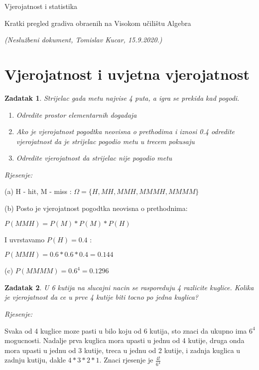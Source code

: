 \documentclass{report}
\newcommand{\Dbar}{\stackinset{l}{0.1ex}{c}{}{\rule{0.33em}{0.3pt}}{D}}
\newcommand{\rjesenje}{\begin{flushleft}\it Rjesenje:\end{flushleft}}
\newcommand{\onespace}{\vspace{1pc}}
\theoremstyle{plain}
\newtheorem{thm}{Zadatak}[chapter] %
\begin{document}
\centerline{\sc \large Vjerojatnost i statistika}
\vspace{.5pc}
\centerline{\sc Kratki pregled gradiva obra\scriptsize\Dbar\normalsize enih na Visokom učilištu Algebra}
\centerline{\it (Neslužbeni dokument, Tomislav Kucar, 15.9.2020.)}
\vspace{2pc}


\section{Vjerojatnost i uvjetna vjerojatnost}
\begin{thm}Strijelac gada metu najvise 4 puta, a igra se prekida kad pogodi.
    \begin{enumerate}[label=(\alph*)]
        \item Odredite prostor elementarnih dogadaja
        \item Ako je vjerojatnost pogodtka neovisna o prethodima i iznosi 0.4 
        odredite vjerojatnost da je strijelac pogodio metu u trecem pokusaju
        \item Odredite vjerojatnost da strijelac nije pogodio metu
    \end{enumerate}
\end{thm} 
\rjesenje

(a) H - hit, M - miss : $\Omega = \{H, MH, MMH, MMMH, MMMM\}$

\onespace

(b) Posto je vjerojatnost pogodtka neovisna o prethodnima: \vspace{0.5pc}

$P(MMH) = P(M) * P(M) * P(H)$ \vspace{0.5pc}

I uvrstavamo $P(H) = 0.4$ : \vspace{0.5pc}

$P(MMH) = 0.6 * 0.6 * 0.4 = 0.144$

\onespace

(c) $P(MMMM) = 0.6^4 = 0.1296$


\onespace
\begin{thm}U 6 kutija na slucajni nacin se rasporeduju 4 razlicite kuglice. 
    Kolika je vjerojatnost da ce u prve 4 kutije biti tocno po jedna kuglica?\end{thm} 
\rjesenje

Svaka od 4 kuglice moze pasti u bilo koju od 6 kutija, sto znaci da ukupno ima
$6^4$ mogucnosti. Nadalje prva kuglica mora upasti u jednu od 4 kutije, druga onda
mora upasti u jednu od 3 kutije, treca u jednu od 2 kutije, i zadnja kuglica u 
zadnju kutiju, dakle $4*3*2*1$. Znaci rjesenje je $\frac{4!}{6^4}$
\end{document}
